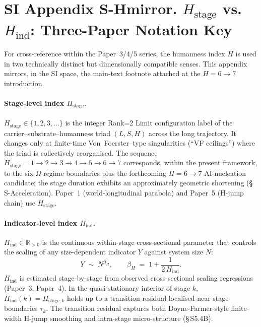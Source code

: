 \documentclass[11pt]{article}
\begin{document}
\section*{SI Appendix S-Hmirror. $H_{\mathrm{stage}}$ vs.\ $H_{\mathrm{ind}}$: Three-Paper Notation Key}

For cross-reference within the Paper~3/4/5 series, the humanness index $H$ is used in two technically distinct but dimensionally compatible senses.  This appendix mirrors, in the SI space, the main-text footnote attached at the $H{=}6\to 7$ introduction.

\paragraph{Stage-level index $H_{\mathrm{stage}}$.} $H_{\mathrm{stage}}\in\{1,2,3,\ldots\}$ is the integer Rank=2 Limit configuration label of the carrier--substrate--humanness triad $(L,S,H)$ across the long trajectory.  It changes only at finite-time Von~Foerster--type singularities (``VF ceilings'') where the triad is collectively reorganised.  The sequence $H_{\mathrm{stage}}=1\to 2\to 3\to 4\to 5\to 6\to 7$ corresponds, within the present framework, to the six $\Omega$-regime boundaries plus the forthcoming $H{=}6\to 7$ AI-nucleation candidate; the stage duration exhibits an approximately geometric shortening (\S\,S-Acceleration).  Paper~1 (world-longitudinal parabola) and Paper~5 (H-jump chain) use $H_{\mathrm{stage}}$.

\paragraph{Indicator-level index $H_{\mathrm{ind}}$.} $H_{\mathrm{ind}}\in\mathbb{R}_{>0}$ is the continuous within-stage cross-sectional parameter that controls the scaling of any size-dependent indicator $Y$ against system size $N$:
\begin{equation}
Y \;\sim\; N^{\beta_H},\qquad \beta_H \;=\; 1 + \frac{1}{2\,H_{\mathrm{ind}}}.
\label{eq:S-Hmirror-betaH}
\end{equation}
$H_{\mathrm{ind}}$ is estimated stage-by-stage from observed cross-sectional scaling regressions (Paper~3, Paper~4).  In the quasi-stationary interior of stage $k$, $H_{\mathrm{ind}}(k) = H_{\mathrm{stage},k}$ holds up to a transition residual localised near stage boundaries $\tau_k$.  The transition residual captures both Doyne-Farmer-style finite-width H-jump smoothing and intra-stage micro-structure (\S\,S5.4B).
\end{document}
